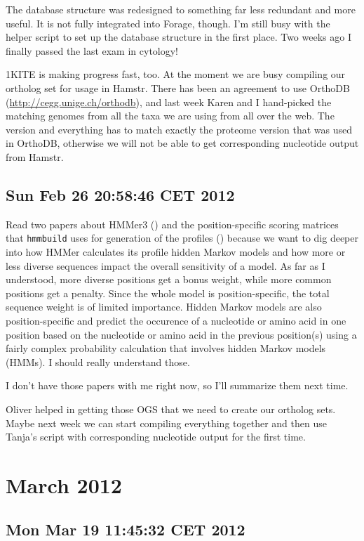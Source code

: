 The database structure was redesigned to something far less redundant and more
useful. It is not fully integrated into Forage, though. I'm still busy with the
helper script to set up the database structure in the first place. Two weeks ago
I finally passed the last exam in cytology! 

1KITE is making progress fast, too. At the moment we are busy compiling our
ortholog set for usage in Hamstr. There has been an agreement to use OrthoDB
(\url{http://cegg.unige.ch/orthodb}), and last week Karen and I hand-picked the
matching genomes from all the taxa we are using from all over the web. The
version and everything has to match exactly the proteome version that was used
in OrthoDB, otherwise we will not be able to get corresponding nucleotide output
from Hamstr. 

\subsection*{Sun Feb 26 20:58:46 CET 2012}

Read two papers about HMMer3 (\cite{Eddy2009}) and the position-specific scoring
matrices that \lstinline{hmmbuild} uses for generation of the profiles
(\cite{Henikoff1994}) because we want to dig deeper into how HMMer calculates
its profile hidden Markov models and how more or less diverse sequences impact
the overall sensitivity of a model. As far as I understood, more diverse
positions get a bonus weight, while more common positions get a penalty. Since
the whole model is position-specific, the total sequence weight is of limited
importance. Hidden Markov models are also position-specific and predict the
occurence of a nucleotide or amino acid in one position based on the nucleotide
or amino acid in the previous position(s) using a fairly complex probability
calculation that involves hidden Markov models (HMMs). I should really
understand those.

I don't have those papers with me right now, so I'll summarize them next time.

Oliver helped in getting those OGS that we need to create our ortholog sets.
Maybe next week we can start compiling everything together and then use Tanja's
script with corresponding nucleotide output for the first time.

\section{March 2012}
\subsection*{Mon Mar 19 11:45:32 CET 2012}

